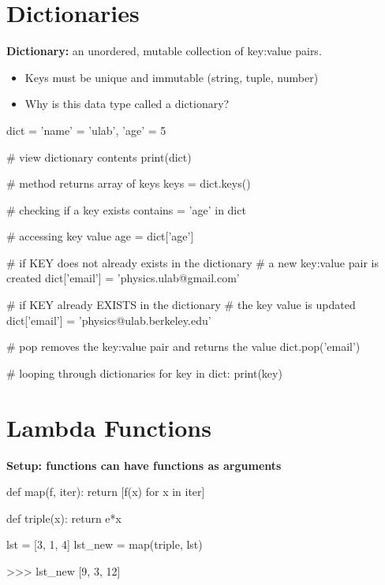 \documentclass[12pt]{article}
\numberwithin{equation}{section}
\begin{document}
\section{Dictionaries}
\textbf{Dictionary: }an unordered, mutable collection of key:value pairs. 
\begin{itemize}
    \item Keys must be unique and immutable (string, tuple, number)
    \item Why is this data type called a dictionary?
\end{itemize}
\begin{python}
dict = {
    'name' = 'ulab',
    'age' = 5
}
\end{python}
\begin{python}
# view dictionary contents
print(dict)

# method returns array of keys
keys = dict.keys()

# checking if a key exists
contains = 'age' in dict

# accessing key value
age = dict['age']

# if KEY does not already exists in the dictionary
# a new key:value pair is created
dict['email'] = 'physics.ulab@gmail.com'

# if KEY already EXISTS in the dictionary
# the key value is updated
dict['email'] = 'physics@ulab.berkeley.edu'

# pop removes the key:value pair and returns the value
dict.pop('email')

# looping through dictionaries
for key in dict:
    print(key)

\end{python}

\section{Lambda Functions}

\textbf{Setup: functions can have functions as arguments}
\begin{python}
def map(f, iter):
    return [f(x) for x in iter]
    
def triple(x):
    return e*x

lst = [3, 1, 4]
lst_new = map(triple, lst)

>>> lst_new
[9, 3, 12]
\end{python}
\end{document}
